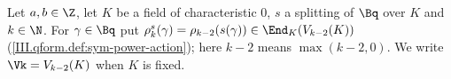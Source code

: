 Let $a,b\in\Z$, let $K$ be a field of characteristic $0$, $s$ a splitting of $\Bq$ over $K$ and $k\in\N$. For $\gamma\in\Bq$ put
$\rho_k^s(\gamma)=\rho_{k-2}(s(\gamma))\in\End_K(V_{k-2}(K))$ (\cref{III.qform.def:sym-power-action}); here $k-2$ means $\max(k-2,0)$. We write
$\Vk=V_{k-2}(K)$ when $K$ is fixed.
